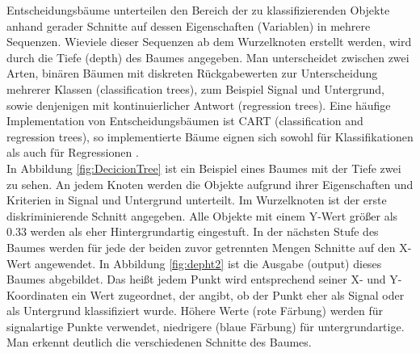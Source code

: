 Entscheidungsb\"aume unterteilen den Bereich der zu klassifizierenden Objekte anhand gerader Schnitte auf dessen Eigenschaften (Variablen) in mehrere Sequenzen. Wieviele dieser Sequenzen ab dem Wurzelknoten erstellt werden, wird durch die Tiefe (depth) des Baumes angegeben. Man unterscheidet zwischen zwei Arten, bin\"aren B\"aumen mit diskreten R\"uckgabewerten zur Unterscheidung mehrerer Klassen (classification trees), zum Beispiel Signal und Untergrund, sowie denjenigen mit kontinuierlicher Antwort (regression trees). \cite{SWB-455193959} Eine h\"aufige Implementation von Entscheidungsb\"aumen ist CART (classification and regression trees), so implementierte B\"aume eignen sich sowohl f\"ur Klassifikationen als auch f\"ur Regressionen \cite{CART}.\\
In Abbildung \ref{fig:DecicionTree} ist ein Beispiel eines Baumes mit der Tiefe zwei zu sehen. An jedem Knoten werden die Objekte aufgrund ihrer Eigenschaften und Kriterien in Signal und Untergrund unterteilt. Im Wurzelknoten ist der erste diskriminierende Schnitt angegeben. Alle Objekte mit einem Y-Wert gr\"o\ss er als 0.33 werden als eher Hintergrundartig eingestuft. In der n\"achsten Stufe des Baumes werden f\"ur jede der beiden zuvor getrennten Mengen Schnitte auf den X-Wert angewendet. In Abbildung \ref{fig:depht2} ist die Ausgabe (output) dieses Baumes abgebildet. Das hei\ss t jedem Punkt wird entsprechend seiner X- und Y-Koordinaten ein Wert zugeordnet, der angibt, ob der Punkt eher als Signal oder als Untergrund klassifiziert wurde. H\"ohere Werte (rote F\"arbung) werden f\"ur signalartige Punkte verwendet, niedrigere (blaue F\"arbung) f\"ur untergrundartige. Man erkennt deutlich die verschiedenen Schnitte des Baumes.\\

